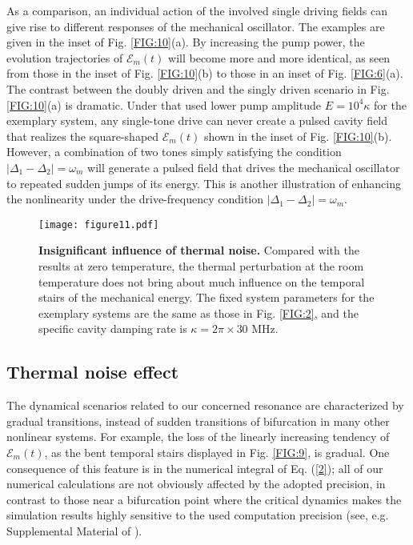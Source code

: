 \documentclass[a4paper,fleqn]{cas-dc}
\begin{document}
As a comparison, an individual action of the involved single driving fields can give rise to different responses of the mechanical oscillator. The examples are given in the inset of Fig. \ref{FIG:10}(a). By increasing the pump power, the evolution trajectories of $\mathcal{E}_m(t)$ will become more and more identical, as seen from those in the inset of Fig. \ref{FIG:10}(b) to those in an inset of Fig. \ref{FIG:6}(a). The contrast between the doubly driven and the singly driven scenario in Fig. \ref{FIG:10}(a) is dramatic. Under that used lower pump amplitude $E=10^4\kappa$ for the exemplary system, any single-tone drive can never create a pulsed cavity field that realizes the square-shaped $\mathcal{E}_m(t)$ shown in the inset of Fig. \ref{FIG:10}(b). However, a combination of two tones simply satisfying the condition $|\Delta_1-\Delta_2|=\omega_m$ will generate a pulsed field that drives the mechanical oscillator to repeated sudden jumps of its energy. This is another illustration of enhancing the nonlinearity under the drive-frequency condition $|\Delta_1-\Delta_2|=\omega_m$. 

\begin{figure}
	\centering
		\texttt{[image: figure11.pdf]}
	\caption{{\bf Insignificant influence of thermal noise.} Compared with the results at zero temperature, the thermal perturbation at the room temperature does not bring about much influence on the temporal stairs of the mechanical energy. The fixed system parameters for the exemplary systems are the same as those in Fig. \ref{FIG:2}, and the specific cavity damping rate is $\kappa=2\pi\times 30$ MHz. }
	\label{FIG:11}
\end{figure}

\subsection{Thermal noise effect}
The dynamical scenarios related to our concerned resonance are characterized by gradual transitions, instead of sudden transitions of bifurcation in many other nonlinear systems. For example, the loss of the linearly increasing tendency of $\mathcal{E}_m(t)$, as the bent 
temporal stairs displayed in Fig. \ref{FIG:9}, is gradual. 
One consequence of this feature is in the numerical integral of Eq. (\ref{2}); all of our numerical calculations are not obviously affected by the adopted precision, 
in contrast to those near a bifurcation point where the critical dynamics makes the simulation results highly sensitive to the used computation precision 
(see, e.g. Supplemental Material of \cite{lin2021catastrophic}). 
\end{document}
